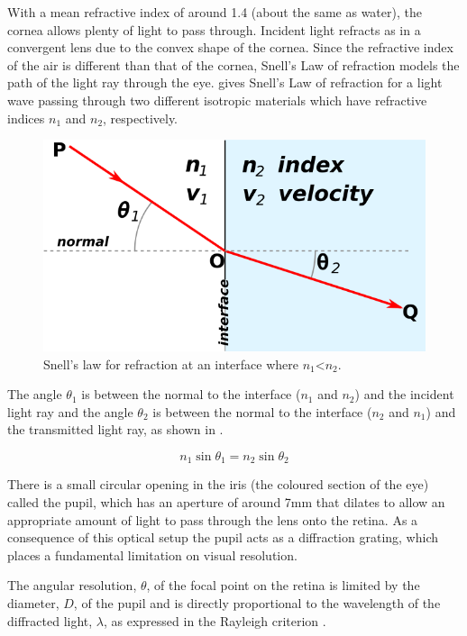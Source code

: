 With a mean refractive index of around 1.4 (about the same as water),
the cornea allows plenty of light to pass through. Incident light refracts
as in a convergent lens due to the convex shape of the cornea. Since
the refractive index of the air is different than that of the cornea, Snell's
Law of refraction models the path of the light ray through the
eye.  gives Snell's Law of refraction for a light wave
passing through two different isotropic materials which have refractive indices
$n_1$ and $n_2$, respectively.

\begin{figure}[H]
\centering
  \includegraphics{figures/snells}
\caption{Snell's law for refraction at an interface where
             $n_1$\textless $n_2$.\cite{wikisnell}}
\label{fig:snell}
\end{figure}

The angle $\theta_1$ is between the normal to the interface ($n_1$ and $n_2$)
and the incident light ray and the angle $\theta_2$ is between the normal to
the interface ($n_2$ and $n_1$) and the transmitted light ray, as shown in
.

\begin{equation}
n_1\sin\theta_1=n_2\sin\theta_2
\label{eq:refractive}
\end{equation}

There is a small circular opening in the iris (the coloured section of
the eye) called the pupil, which has an aperture of around 7mm that
dilates to allow an appropriate amount of light to pass through
the lens onto the retina.\cite{krugman1964some} As a consequence of
this optical setup the pupil acts as a diffraction grating, which places a 
fundamental limitation on visual resolution. 

The angular resolution, $\theta$, of the focal point on the retina is limited by
the diameter, $D$, of the pupil and is directly proportional to the wavelength
of the diffracted light, $\lambda$, as expressed in the Rayleigh criterion
 .\cite{rayleigh1907dynamical}

